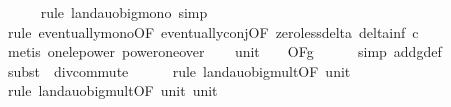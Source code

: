 \begin{isabellebody}
\ \ \ \ \isamarkupfalse%
\ {\isacharparenleft}{\kern0pt}rule\ landau{\isacharunderscore}{\kern0pt}o{\isachardot}{\kern0pt}big{\isacharunderscore}{\kern0pt}mono{\isacharcomma}{\kern0pt}\ simp{\isacharparenright}{\kern0pt}\isanewline
\ \ \ \ \isamarkupfalse%
\ {\isacharparenleft}{\kern0pt}rule\ eventually{\isacharunderscore}{\kern0pt}mono{\isacharbrackleft}{\kern0pt}OF\ eventually{\isacharunderscore}{\kern0pt}conj{\isacharbrackleft}{\kern0pt}OF\ zero{\isacharunderscore}{\kern0pt}less{\isacharunderscore}{\kern0pt}delta\ delta{\isacharunderscore}{\kern0pt}inf{\isacharbrackleft}{\kern0pt}\ c{\isacharequal}{\kern0pt}{\isachardoublequoteopen}{}{\isachardoublequoteclose}{\isacharbrackright}{\kern0pt}{\isacharbrackright}{\kern0pt}{\isacharbrackright}{\kern0pt}{\isacharparenright}{\kern0pt}\isanewline
\ \ \ \ \isamarkupfalse%
\ {\isacharparenleft}{\kern0pt}metis\ one{\isacharunderscore}{\kern0pt}le{\isacharunderscore}{\kern0pt}power\ power{\isacharunderscore}{\kern0pt}one{\isacharunderscore}{\kern0pt}over{\isacharparenright}{\kern0pt}\isanewline
\isanewline
\ \ \isamarkupfalse%
\ unit{\isacharunderscore}{\kern0pt}{}{\isacharcolon}{\kern0pt}\ {\isachardoublequoteopen}{\isacharparenleft}{\kern0pt}{\isasymlambda}{\isacharunderscore}{\kern0pt}{\isachardot}{\kern0pt}\ {}{\isacharparenright}{\kern0pt}\ {\isasymin}\ O{\isacharbrackleft}{\kern0pt}{\isacharquery}{\kern0pt}F{\isacharbrackright}{\kern0pt}{\isacharparenleft}{\kern0pt}g{}{\isacharparenright}{\kern0pt}{\isachardoublequoteclose}\isanewline
\ \ \ \ \isamarkupfalse%
\ {\isacharparenleft}{\kern0pt}simp\ add{\isacharcolon}{\kern0pt}g{}{\isacharunderscore}{\kern0pt}def{\isacharparenright}{\kern0pt}\isanewline
\ \ \ \ \isamarkupfalse%
\ {\isacharparenleft}{\kern0pt}subst\ {\isacharparenleft}{\kern0pt}{}{\isacharparenright}{\kern0pt}\ div{\isacharunderscore}{\kern0pt}commute{\isacharparenright}{\kern0pt}\isanewline
\ \ \ \ \isamarkupfalse%
\ {\isacharparenleft}{\kern0pt}rule\ landau{\isacharunderscore}{\kern0pt}o{\isachardot}{\kern0pt}big{\isacharunderscore}{\kern0pt}mult{\isacharunderscore}{\kern0pt}{}{\isacharbrackleft}{\kern0pt}OF\ unit{\isacharunderscore}{\kern0pt}{}{\isacharbrackright}{\kern0pt}{\isacharparenright}{\kern0pt}\isanewline
\ \ \ \ \isamarkupfalse%
\ {\isacharparenleft}{\kern0pt}rule\ landau{\isacharunderscore}{\kern0pt}o{\isachardot}{\kern0pt}big{\isacharunderscore}{\kern0pt}mult{\isacharunderscore}{\kern0pt}{}{\isacharbrackleft}{\kern0pt}OF\ unit{\isacharunderscore}{\kern0pt}{}\ unit{\isacharunderscore}{\kern0pt}{}{\isacharbrackright}{\kern0pt}{\isacharparenright}{\kern0pt}\isanewline

\end{isabellebody}

